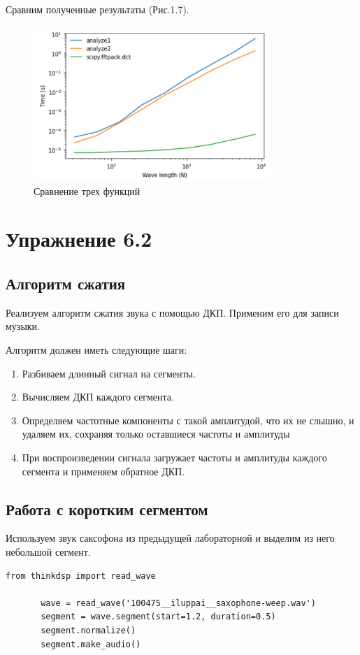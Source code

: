 \documentclass[a4paper,12pt]{report}
\begin{document}
    Сравним полученные результаты (Рис.1.7).
\begin{figure}[H]
        \centering
        \includegraphics[width=0.8\textwidth]{fig1-7.PNG}
        \caption{Сравнение трех функций}
        \label{fig:fig1-7}
\end{figure}

\chapter{Упражнение 6.2}
\section{Алгоритм сжатия}
    Реализуем алгоритм сжатия звука с помощью ДКП. Применим его для записи музыки. 
    
    Алгоритм должен иметь следующие шаги:
\begin{enumerate} 
  \item Разбиваем длинный сигнал на сегменты.
  \item Вычисляем ДКП каждого сегмента.
  \item Определяем частотные компоненты с такой амплитудой, что их не слышно, и удаляем их, сохраняя только оставшиеся частоты и амплитуды
  \item При воспроизведении сигнала загружает частоты и амплитуды каждого сегмента и применяем обратное ДКП.
\end{enumerate}

\section{Работа с коротким сегментом}
    Используем звук саксофона из предыдущей лабораторной и выделим из него небольшой сегмент.
\begin{lstlisting}[caption=Выделение сегмента]
       from thinkdsp import read_wave

       wave = read_wave('100475__iluppai__saxophone-weep.wav')
       segment = wave.segment(start=1.2, duration=0.5)
       segment.normalize()
       segment.make_audio()
\end{lstlisting}
\end{document}
